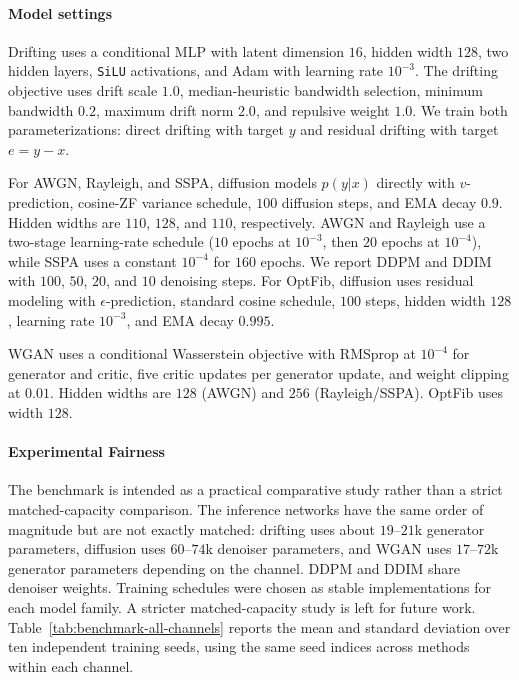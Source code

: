 \documentclass[conference]{IEEEtran}
\begin{document}
\paragraph{Model settings}
Drifting uses a conditional MLP with latent dimension \(16\), hidden width \(128\), two hidden layers, \texttt{SiLU} activations, and Adam with learning rate \(10^{-3}\). The drifting objective uses drift scale \(1.0\), median-heuristic bandwidth selection, minimum bandwidth \(0.2\), maximum drift norm \(2.0\), and repulsive weight \(1.0\). We train both parameterizations: direct drifting with target \(y\) and residual drifting with target \(e=y-x\).

For AWGN, Rayleigh, and SSPA, diffusion models \(p(y | x)\) directly with \(v\)-prediction, cosine-ZF variance schedule, \(100\) diffusion steps, and EMA decay \(0.9\). Hidden widths are \(110\), \(128\), and \(110\), respectively. AWGN and Rayleigh use a two-stage learning-rate schedule (\(10\) epochs at \(10^{-3}\), then \(20\) epochs at \(10^{-4}\)), while SSPA uses a constant \(10^{-4}\) for \(160\) epochs. We report DDPM and DDIM with \(100\), \(50\), \(20\), and \(10\) denoising steps. For OptFib, diffusion uses residual modeling with \(\epsilon\)-prediction, standard cosine schedule, \(100\) steps, hidden width \(128\), learning rate \(10^{-3}\), and EMA decay \(0.995\).

WGAN uses a conditional Wasserstein objective with RMSprop at \(10^{-4}\) for generator and critic, five critic updates per generator update, and weight clipping at \(0.01\). Hidden widths are \(128\) (AWGN) and \(256\) (Rayleigh/SSPA). OptFib uses width \(128\).

\paragraph{Experimental Fairness} The benchmark is intended as a practical comparative study rather than a strict matched-capacity comparison. The inference networks have the same order of magnitude but are not exactly matched: drifting uses about \(19\)--\(21\)k generator parameters, diffusion uses \(60\)--\(74\)k denoiser parameters, and WGAN uses \(17\)--\(72\)k generator parameters depending on the channel. DDPM and DDIM share denoiser weights. Training schedules were chosen as stable implementations for each model family. A stricter matched-capacity study is left for future work.
Table~\ref{tab:benchmark-all-channels} reports the mean and standard deviation over ten independent training seeds, using the same seed indices across methods within each channel.
\end{document}
